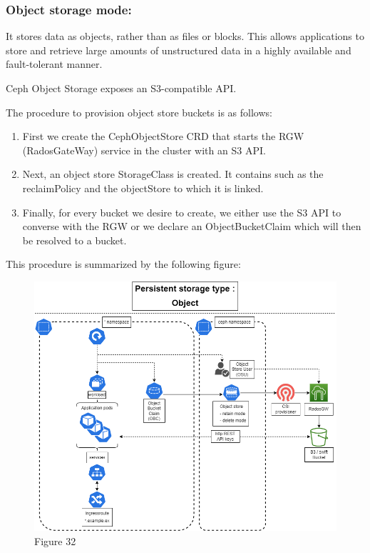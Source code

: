 \subsubsection{Object storage mode: }

It stores data as objects, rather than as files or blocks. This allows applications to store and retrieve large amounts of unstructured data in a highly available and fault-tolerant manner. 

Ceph Object Storage exposes an S3-compatible API. 

The procedure to provision object store buckets is as follows: 

\begin{enumerate}[label = (\arabic*)]
    \item First we create the CephObjectStore CRD that starts the RGW (RadosGateWay) service in the cluster with an S3 API. 
    \item Next, an object store StorageClass is created. It contains such as the reclaimPolicy and the objectStore to which it is linked. 
    \item Finally, for every bucket we desire to create, we either use the S3 API to converse with the RGW or we declare an ObjectBucketClaim which will then be resolved to a bucket. 
\end{enumerate}
This procedure is summarized by the following figure: 
\begin{figure}[H]\centering
\includegraphics[width=1.0\textwidth,angle=00]{assets/f32.png}
\caption{Figure 32 }
\label{fig:f32}
\end{figure}

